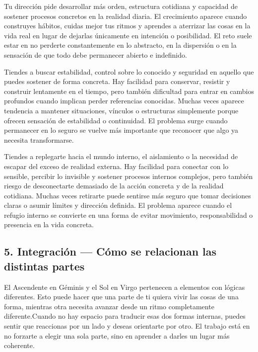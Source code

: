 \documentclass[11pt,a4paper]{article}
\begin{document}
Tu dirección pide desarrollar más orden, estructura cotidiana y capacidad de sostener procesos concretos en la realidad diaria. El crecimiento aparece cuando construyes hábitos, cuidas mejor tus ritmos y aprendes a aterrizar las cosas en la vida real en lugar de dejarlas únicamente en intención o posibilidad. El reto suele estar en no perderte constantemente en lo abstracto, en la dispersión o en la sensación de que todo debe permanecer abierto e indefinido.

Tiendes a buscar estabilidad, control sobre lo conocido y seguridad en aquello que puedes sostener de forma concreta. Hay facilidad para conservar, resistir y construir lentamente en el tiempo, pero también dificultad para entrar en cambios profundos cuando implican perder referencias conocidas. Muchas veces aparece tendencia a mantener situaciones, vínculos o estructuras simplemente porque ofrecen sensación de estabilidad o continuidad. El problema surge cuando permanecer en lo seguro se vuelve más importante que reconocer que algo ya necesita transformarse.

Tiendes a replegarte hacia el mundo interno, el aislamiento o la necesidad de escapar del exceso de realidad externa. Hay facilidad para conectar con lo sensible, percibir lo invisible y sostener procesos internos complejos, pero también riesgo de desconectarte demasiado de la acción concreta y de la realidad cotidiana. Muchas veces retirarte puede sentirse más seguro que tomar decisiones claras o asumir límites y dirección definida. El problema aparece cuando el refugio interno se convierte en una forma de evitar movimiento, responsabilidad o presencia en la vida concreta.

\vspace{0.5cm}


\subsection{5. Integración — Cómo se relacionan las distintas partes}

El Ascendente en Géminis y el Sol en Virgo pertenecen a elementos con lógicas diferentes. Esto puede hacer que una parte de ti quiera vivir las cosas de una forma, mientras otra necesita avanzar desde un ritmo completamente diferente.Cuando no hay espacio para traducir esas dos formas internas, puedes sentir que reaccionas por un lado y deseas orientarte por otro. El trabajo está en no forzarte a elegir una sola parte, sino en aprender a darles un lugar más coherente.
\end{document}
